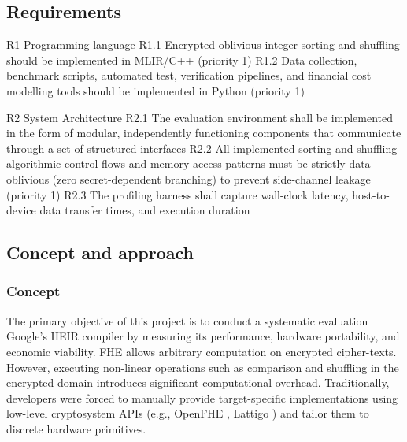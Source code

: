 \newpage
\subsection{Requirements}   

R1 Programming language \newline
R1.1 Encrypted oblivious integer sorting and shuffling should be implemented in MLIR/C++ (priority 1) \newline
R1.2 Data collection, benchmark scripts, automated test, verification pipelines, and financial cost modelling tools should be implemented in Python (priority 1)

R2 System Architecture \newline
R2.1 The evaluation environment shall be implemented in the form of modular, independently functioning components that communicate through a set of structured interfaces \newline
R2.2 All implemented sorting and shuffling algorithmic control flows and memory access patterns must be strictly data-oblivious (zero secret-dependent branching) to prevent side-channel leakage (priority 1)
R2.3 The profiling harness shall capture wall-clock latency, host-to-device data transfer times, and execution duration
\subsection{Concept and approach} 

\subsubsection{Concept}
The primary objective of this project is to conduct a systematic evaluation Google's HEIR compiler by measuring its performance, hardware portability, and economic viability.
FHE allows arbitrary computation on encrypted cipher-texts. However, executing non-linear operations such as comparison and shuffling in the encrypted domain introduces significant computational overhead. Traditionally, developers were forced to manually provide target-specific implementations using low-level cryptosystem APIs (e.g., OpenFHE \cite{cryptoeprint:2022/915}, Lattigo \cite{lattigo}) and tailor them to discrete hardware primitives.

